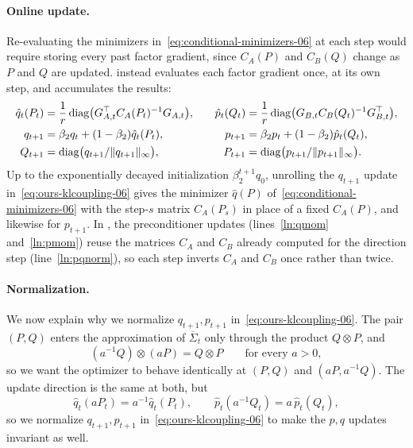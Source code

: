 \paragraph{Online update.} Re-evaluating the minimizers
in~\eqref{eq:conditional-minimizers-06} at each step would require
storing every past factor gradient, since $C_A(P)$ and $C_B(Q)$ change
as $P$ and $Q$ are updated. \methodname{} instead evaluates each factor
gradient once, at its own step, and accumulates the results:
\begin{equation}\label{eq:ours-klcoupling-06}
\begin{alignedat}{2}
  \hat{q}_t(P_t)
    &= \frac1r\operatorname{diag}\bigl(G_{A,t}^\top C_A(P_t)^{-1}G_{A,t}\bigr),
  &\qquad
  \hat{p}_t(Q_t)
    &= \frac1r\operatorname{diag}\bigl(G_{B,t} C_B(Q_t)^{-1}G_{B,t}^\top\bigr),
  \\
  q_{t+1}
    &= \beta_2q_t+(1-\beta_2)\hat{q}_t(P_t),
  &\qquad
  p_{t+1}
    &= \beta_2p_t+(1-\beta_2)\hat{p}_t(Q_t),
  \\
  Q_{t+1}
    &= \operatorname{diag}\bigl(q_{t+1}/\| q_{t+1}\|_\infty\bigr),
  &\qquad
  P_{t+1}
    &= \operatorname{diag}\bigl(p_{t+1}/\| p_{t+1}\|_\infty\bigr).
\end{alignedat}
\end{equation}
Up to the exponentially decayed initialization $\beta_2^{t+1}q_0$, unrolling the
$q_{t+1}$ update in~\eqref{eq:ours-klcoupling-06} gives the
minimizer $\hat q(P)$ of~\eqref{eq:conditional-minimizers-06} with the
step-$s$ matrix $C_A(P_s)$ in place of a fixed $C_A(P)$, and likewise for $p_{t+1}$. In , the preconditioner updates (lines~\ref{ln:qmom}
and~\ref{ln:pmom}) reuse the matrices $C_A$ and $C_B$ already computed for the direction step (line~\ref{ln:pqnorm}), so each step inverts $C_A$ and $C_B$ once rather than twice.

\paragraph{Normalization.} We now explain why we normalize $q_{t+1},p_{t+1}$
in~\eqref{eq:ours-klcoupling-06}. The pair $(P, Q)$ enters the
approximation of $\overline \Sigma_t$ only through the product
$Q \otimes P$, and
\[
  (a^{-1}Q)\otimes(aP)=Q\otimes P
  \qquad\text{for every } a>0,
\]
so we want the optimizer to behave identically at $(P,Q)$ and
$(aP,a^{-1}Q)$. The update direction is the same at both, but
\[
  \hat q_t(aP_t)=a^{-1}\hat q_t(P_t),
  \qquad
  \hat p_t(a^{-1}Q_t)=a\,\hat p_t(Q_t),
\]
so we normalize $q_{t+1},p_{t+1}$ in~\eqref{eq:ours-klcoupling-06} to
make the $p,q$ updates invariant as well.